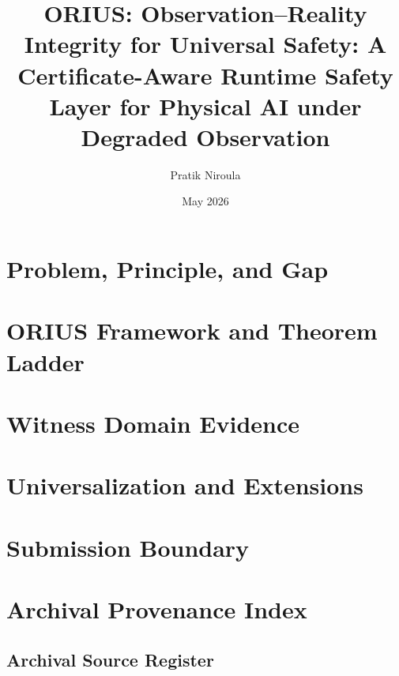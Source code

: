\documentclass[12pt,oneside]{book}
\title{ORIUS: Observation--Reality Integrity for Universal Safety: A Certificate-Aware Runtime Safety Layer for Physical AI under Degraded Observation}
\author{Pratik Niroula}
\date{May 2026}
\begin{document}
\hypersetup{pageanchor=false}
\frontmatter

\cleardoublepage

\cleardoublepage

\tableofcontents
\listoftables
\listoffigures

\hypersetup{pageanchor=true}
\mainmatter

\part{Problem, Principle, and Gap}




\part{ORIUS Framework and Theorem Ladder}




\part{Witness Domain Evidence}



\part{Universalization and Extensions}






\part{Submission Boundary}


\part{Archival Provenance Index}
\chapter{Archival Source Register}
\label{ch:archival-source-register}
\end{document}

